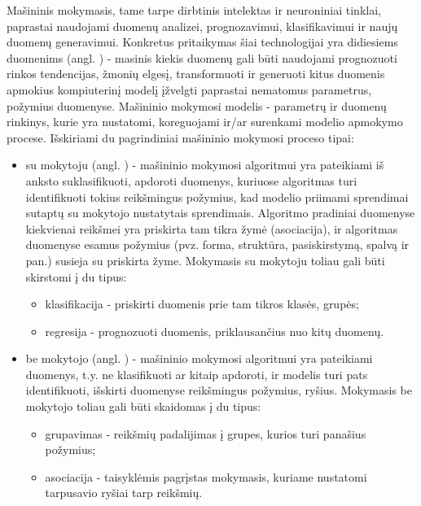 \documentclass{VUMIFInfBakalaurinis}
\begin{document}
Mašininis mokymasis, tame tarpe dirbtinis intelektas ir neuroniniai tinklai, 
paprastai naudojami duomenų analizei, prognozavimui, klasifikavimui ir naujų 
duomenų generavimui. Konkretus pritaikymas šiai technologijai yra didiesiems 
duomenims (angl. ) - masinis kiekis duomenų gali būti 
naudojami prognozuoti rinkos tendencijas, žmonių elgesį, transformuoti ir 
generuoti kitus duomenis apmokius kompiuterinį modelį įžvelgti paprastai 
nematomus parametrus, požymius duomenyse. Mašininio mokymosi modelis - parametrų 
ir duomenų rinkinys, kurie yra nustatomi, koreguojami ir/ar surenkami modelio 
apmokymo procese. Išskiriami du pagrindiniai mašininio mokymosi proceso tipai:
\begin{itemize}
  \item su mokytoju (angl. ) - mašininio mokymosi 
    algoritmui yra pateikiami iš anksto suklasifikuoti, apdoroti duomenys, 
    kuriuose algoritmas turi identifikuoti tokius reikšmingus požymius, kad 
    modelio priimami sprendimai sutaptų su mokytojo nustatytais sprendimais.
    Algoritmo pradiniai duomenyse kiekvienai reikšmei yra priskirta tam tikra 
    žymė (asociacija), ir algoritmas duomenyse esamus požymius (pvz. forma, 
    struktūra, pasiskirstymą, spalvą ir pan.) susieja su priskirta žyme. 
    Mokymasis su mokytoju toliau gali būti skirstomi į du tipus:
    \begin{itemize}
      \item klasifikacija - priskirti duomenis prie tam tikros klasės, grupės;
      \item regresija - prognozuoti duomenis, priklausančius nuo kitų duomenų.
    \end{itemize}
  \item be mokytojo (angl. ) - mašininio 
    mokymosi algoritmui yra pateikiami  duomenys, t.y. ne 
    klasifikuoti ar kitaip apdoroti, ir modelis turi pats identifikuoti, 
    išskirti duomenyse reikšmingus požymius, ryšius. Mokymasis be mokytojo 
    toliau gali būti skaidomas į du tipus:
    \begin{itemize}
      \item grupavimas - reikšmių padalijimas į grupes, kurios turi panašius 
        požymius;
      \item asociacija - taisyklėmis pagrįstas mokymasis, kuriame nustatomi 
        tarpusavio ryšiai tarp reikšmių.
    \end{itemize}
\end{itemize}
\end{document}
